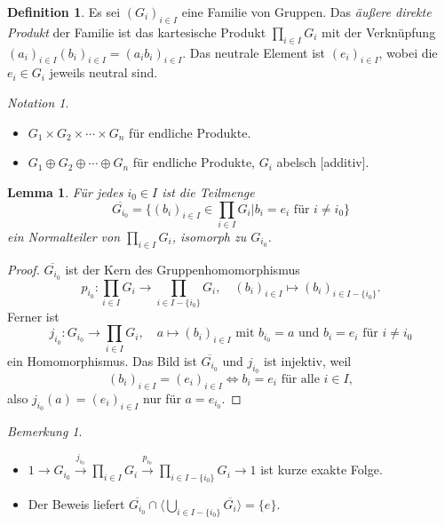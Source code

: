 \documentclass[12pt]{scrartcl} %
\newtheorem{lemma}[thm]{Lemma}
\theoremstyle{definition}
\newtheorem*{defn}{Definition}
\theoremstyle{remark}
\newtheorem*{notation}{Notation}
\newtheorem*{nb}{Bemerkung}
\newcommand{\defi}{\emph}
\begin{document}
\begin{defn}
	Es sei $(G_i)_{i \in I}$ eine Familie von Gruppen.
	Das \defi{äußere direkte Produkt} der Familie ist das kartesische Produkt $\prod_{i \in I}G_i$ mit der Verknüpfung $(a_i)_{i \in I} (b_i)_{i \in I} = (a_ib_i)_{i \in I}$.
	Das neutrale Element ist $(e_i)_{i \in I}$, wobei die $e_i \in G_i$ jeweils neutral sind.
\end{defn}

\begin{notation}
	\begin{itemize}
	\item $G_1 \times G_2 \times \dotsb \times G_n$ für endliche Produkte.
	\item $G_1 \oplus G_2 \oplus \dotsb \oplus G_n$ für endliche Produkte, $G_i$ abelsch [additiv].
	\end{itemize}
\end{notation}

\begin{lemma}
	Für jedes $i_0 \in I$ ist die Teilmenge
	$$ \overline{G_{i_0}} = \{(b_i)_{i \in I} \in \prod_{i \in I}G_i | b_i = e_i \text{ für } i \neq i_0\} $$
	ein Normalteiler von $\prod_{i \in I}G_i$, isomorph zu $G_{i_0}$.
\end{lemma}

\begin{proof}
	$\overline{G_{i_0}}$ ist der Kern des Gruppenhomomorphismus
	$$p_{i_0}: \prod_{i \in I}G_i \rightarrow \prod_{i \in I-\{i_0\}}G_i, \quad (b_i)_{i \in I} \mapsto (b_i)_{i \in I-\{i_0\}}.$$ %
	Ferner ist
	$$j_{i_0}: G_{i_0} \rightarrow \prod_{i \in I}G_i, \quad a \mapsto (b_i)_{i \in I} \text{ mit \(b_{i_0}=a\) und \(b_i = e_i \text{ für } i \neq i_0\)}$$
	ein Homomorphismus.
	Das Bild ist $\overline{G_{i_0}}$ und $j_{i_0}$ ist injektiv, weil
	$$(b_i)_{i \in I} = (e_i)_{i \in I} \Leftrightarrow b_i = e_i \text{ für alle } i \in I,$$
	also \(j_{i_0}(a) = (e_i)_{i \in I}\) nur für \(a = e_{i_0}\).
\end{proof}

\begin{nb}
	\begin{itemize}
		\item $1 \longrightarrow G_{i_0} \stackrel{j_{i_0}}{\longrightarrow} \prod_{i \in I}G_i \stackrel{p_{i_0}}{\longrightarrow} \prod_{i \in I-\{i_0\}}G_i \longrightarrow 1$ ist kurze exakte Folge.
		\item Der Beweis liefert $\overline{G_{i_0}} \cap \langle \bigcup_{i \in I-\{i_0\}}\overline{G_i} \rangle = \{e\}$.
	\end{itemize}
\end{nb}
\end{document}
